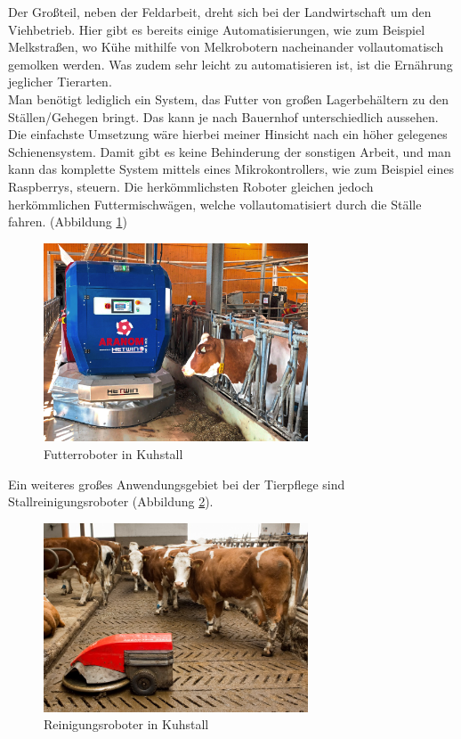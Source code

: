 Der Großteil, neben der Feldarbeit, dreht sich bei der Landwirtschaft um den
Viehbetrieb. Hier gibt es bereits einige Automatisierungen, wie zum Beispiel
Melkstraßen, wo Kühe mithilfe von Melkrobotern nacheinander vollautomatisch
gemolken werden. Was zudem sehr leicht zu automatisieren ist, ist die Ernährung
jeglicher Tierarten.\\ Man benötigt lediglich ein System, das Futter von großen
Lagerbehältern zu den Ställen/Gehegen bringt. Das kann je nach Bauernhof
unterschiedlich aussehen. Die einfachste Umsetzung wäre hierbei meiner Hinsicht
nach ein höher gelegenes Schienensystem. Damit gibt es keine Behinderung der
sonstigen Arbeit, und man kann das komplette System mittels eines
Mikrokontrollers, wie zum Beispiel eines Raspberrys, steuern. Die
herkömmlichsten Roboter gleichen jedoch herkömmlichen Futtermischwägen, welche
vollautomatisiert durch die Ställe fahren. (Abbildung \ref{fig:futterroboter})

\begin{figure}[ht]
    \centering
    \includegraphics[width=0.7\textwidth]{bilder/futterroboter.jpg}
    \caption[Futterroboter in Kuhstall]{Futterroboter in Kuhstall\cite{Futterroboter}}
    \label{fig:futterroboter}
\end{figure}

Ein weiteres großes Anwendungsgebiet bei der Tierpflege sind
Stallreinigungsroboter (Abbildung \ref{fig:rroboter}).

\begin{figure}[ht]
    \centering
    \includegraphics[width=0.7\textwidth]{bilder/Spaltenroboter_agrarfoto.com_.jpg}
    \caption[Reinigungsroboter in Kuhstall]{Reinigungsroboter in Kuhstall\cite{Reinigungsroboter}}
    \label{fig:rroboter}
\end{figure}

